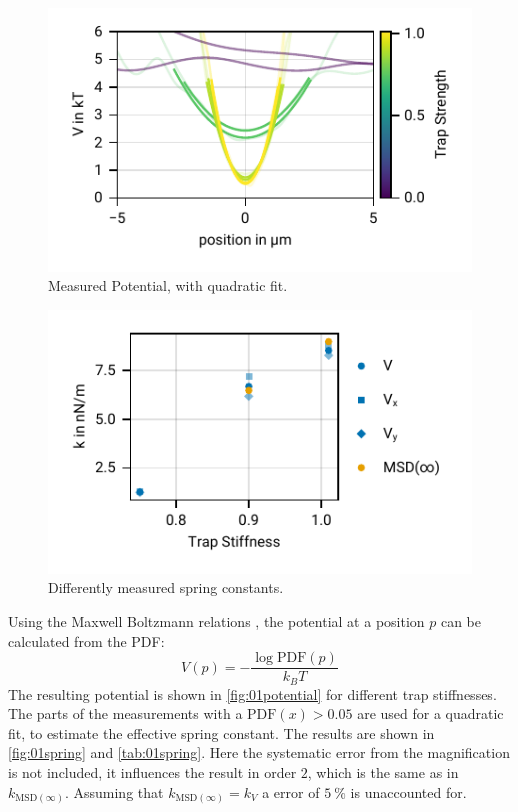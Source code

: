 \documentclass[
    twoside=false,
    twocolumn=true,
    fontsize=11pt,
]{scrarticle}
\begin{document}
\begin{figure}
    \centering
    \includegraphics{figures/01_03_3_axis.pdf}
    \caption{Measured Potential, with quadratic fit.}
    \label{fig:01potential}
\end{figure}
\begin{figure}
    \centering
    \includegraphics{figures/01_03_4_spring_constants.pdf}
    \caption{Differently measured spring constants.}
    \label{fig:01spring}
\end{figure}
Using the Maxwell Boltzmann relations \cite{instructions}, the potential at a position $p$ can be calculated from the PDF:
\begin{equation}
    V(p) = - \frac{\log{\text{PDF}(p)}}{k_B T}
    \label{eq:pot_boltzmann}
\end{equation}
The resulting potential is shown in \autoref{fig:01potential} for different trap stiffnesses.
The parts of the measurements with a $\text{PDF}(x)>0.05$ are used for a quadratic fit, to estimate the effective spring constant.
The results are shown in \autoref{fig:01spring} and \autoref{tab:01spring}.
Here the systematic error from the magnification is not included, it influences the result in order $2$, which is the same as in $k_{\text{MSD}(\infty)}$.
Assuming that $k_{\text{MSD}(\infty)}=k_V$ a error of $\SI{5}{\percent}$ is unaccounted for.
\end{document}
